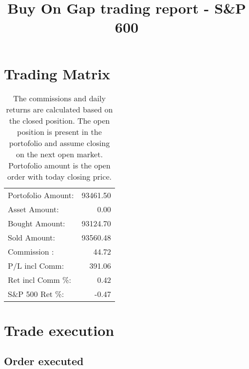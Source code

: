 \documentclass{tufte-handout}\usepackage[]{graphicx}\usepackage[]{color}
\begin{document}
\section{Trading Matrix}


\begin{table}[ht]
\begin{tabular}{lr}
   \hline
Portofolio Amount: & 93461.50 \\ 
  Asset Amount: & 0.00 \\ 
  Bought Amount: & 93124.70 \\ 
  Sold   Amount: & 93560.48 \\ 
  Commission   : & 44.72 \\ 
  P/L incl Comm: & 391.06 \\ 
  Ret incl Comm \%: & 0.42 \\ 
  S\&P 500 Ret \%: & -0.47 \\ 
   \hline
\end{tabular}
\caption{The commissions and daily returns are calculated based on the closed position.
The open position is present in the portofolio and assume closing on the next open market.
Portofolio amount is the open order with today closing price.} 
\end{table}



% 
% 


\title{Buy On Gap trading report - S\&P 600}
\maketitle

\section{Trade execution}
\subsection{Order executed}
\end{document}
